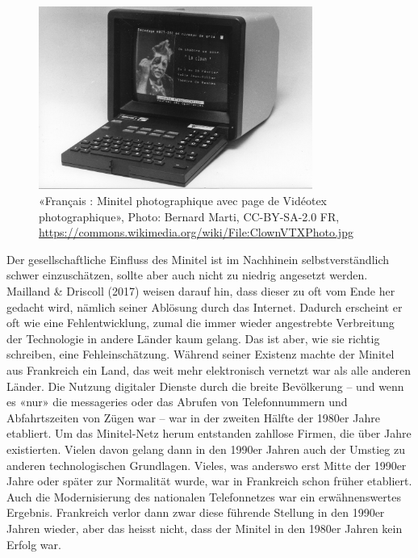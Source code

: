 \documentclass[a4paper,
fontsize=11pt,
oneside,
numbers=noperiodatend,
parskip=half-,
bibliography=totoc,
final
]{scrartcl}
\begin{document}
\begin{figure}
\centering
\includegraphics[width=0.8\textwidth]{img/Minitel.jpg}
\caption{«Français : Minitel photographique avec page de Vidéotex
photographique», Photo: Bernard Marti, CC-BY-SA-2.0 FR,
\url{https://commons.wikimedia.org/wiki/File:ClownVTXPhoto.jpg}}
\end{figure}

Der gesellschaftliche Einfluss des Minitel ist im Nachhinein
selbstverständlich schwer einzuschätzen, sollte aber auch nicht zu
niedrig angesetzt werden. Mailland \& Driscoll (2017) weisen darauf hin,
dass dieser zu oft vom Ende her gedacht wird, nämlich seiner Ablösung
durch das Internet. Dadurch erscheint er oft wie eine Fehlentwicklung,
zumal die immer wieder angestrebte Verbreitung der Technologie in andere
Länder kaum gelang. Das ist aber, wie sie richtig schreiben, eine
Fehleinschätzung. Während seiner Existenz machte der Minitel aus
Frankreich ein Land, das weit mehr elektronisch vernetzt war als alle
anderen Länder. Die Nutzung digitaler Dienste durch die breite
Bevölkerung -- und wenn es «nur» die messageries oder das Abrufen von
Telefonnummern und Abfahrtszeiten von Zügen war -- war in der zweiten
Hälfte der 1980er Jahre etabliert. Um das Minitel-Netz herum entstanden
zahllose Firmen, die über Jahre existierten. Vielen davon gelang dann in
den 1990er Jahren auch der Umstieg zu anderen technologischen
Grundlagen. Vieles, was anderswo erst Mitte der 1990er Jahre oder später
zur Normalität wurde, war in Frankreich schon früher etabliert. Auch die
Modernisierung des nationalen Telefonnetzes war ein erwähnenswertes
Ergebnis. Frankreich verlor dann zwar diese führende Stellung in den
1990er Jahren wieder, aber das heisst nicht, dass der Minitel in den
1980er Jahren kein Erfolg war.
\end{document}

